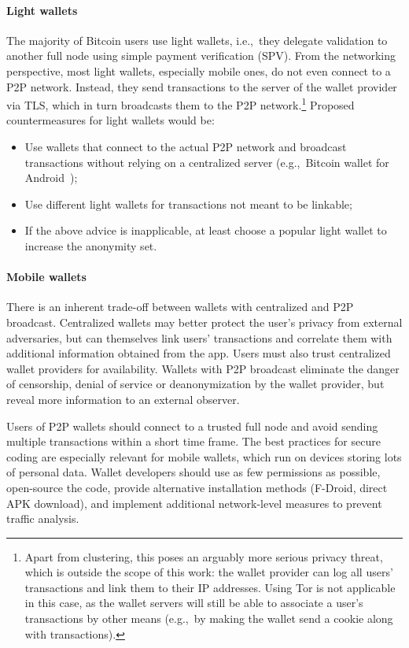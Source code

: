 \paragraph{Light wallets}
The majority of Bitcoin users use light wallets, i.e.,~they delegate validation to another full node using simple payment verification (SPV).
From the networking perspective, most light wallets, especially mobile ones, do not even connect to a P2P network.
Instead, they send transactions to the server of the wallet provider via TLS, which in turn broadcasts them to the P2P network.\footnote{Apart from clustering, this poses an arguably more serious privacy threat, which is outside the scope of this work: the wallet provider can log all users' transactions and link them to their IP addresses. Using Tor is not applicable in this case, as the wallet servers will still be able to associate a user's transactions by other means (e.g.,~by making the wallet send a cookie along with transactions).}
Proposed countermeasures for light wallets would be:
\begin{itemize}
	\item Use wallets that connect to the actual P2P network and broadcast transactions without relying on a centralized server (e.g.,~Bitcoin wallet for Android~\cite{BitcoinWallet});
	\item Use different light wallets for transactions not meant to be linkable;
	\item If the above advice is inapplicable, at least choose a popular light wallet to increase the anonymity set.
\end{itemize}

\paragraph{Mobile wallets}
There is an inherent trade-off between wallets with centralized and P2P broadcast.
Centralized wallets may better protect the user's privacy from external adversaries, but can themselves link users' transactions and correlate them with additional information obtained from the app.
Users must also trust centralized wallet providers for availability.
Wallets with P2P broadcast eliminate the danger of censorship, denial of service or deanonymization by the wallet provider, but reveal more information to an external observer.

Users of P2P wallets should connect to a trusted full node and avoid sending multiple transactions within a short time frame.
The best practices for secure coding are especially relevant for mobile wallets, which run on devices storing lots of personal data.
Wallet developers should use as few permissions as possible, open-source the code, provide alternative installation methods (F-Droid, direct APK download), and implement additional network-level measures to prevent traffic analysis.


